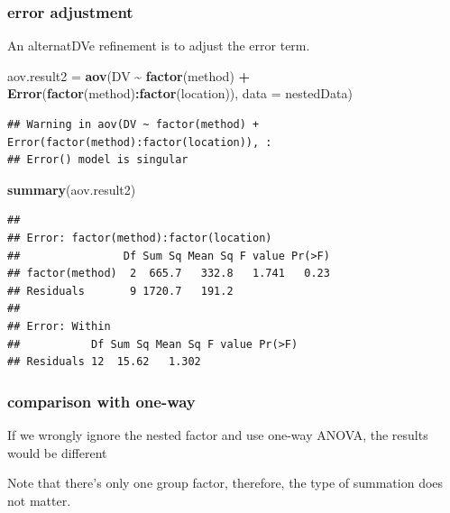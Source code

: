 \documentclass[
]{ctexart}
\newenvironment{Shaded}{\begin{snugshade}}{\end{snugshade}}
\newcommand{\AttributeTok}[1]{\textcolor[rgb]{0.13,0.29,0.53}{#1}}
\newcommand{\FunctionTok}[1]{\textcolor[rgb]{0.13,0.29,0.53}{\textbf{#1}}}
\newcommand{\NormalTok}[1]{#1}
\newcommand{\OtherTok}[1]{\textcolor[rgb]{0.56,0.35,0.01}{#1}}
\newcommand{\SpecialCharTok}[1]{\textcolor[rgb]{0.81,0.36,0.00}{\textbf{#1}}}
\begin{document}
\hypertarget{error-adjustment}{%
\subsubsection{error adjustment}\label{error-adjustment}}

An alternatDVe refinement is to adjust the error term.

\begin{Shaded}
\begin{Highlighting}[]
\NormalTok{aov.result2 }\OtherTok{=} \FunctionTok{aov}\NormalTok{(DV }\SpecialCharTok{\textasciitilde{}} \FunctionTok{factor}\NormalTok{(method) }\SpecialCharTok{+} 
                    \FunctionTok{Error}\NormalTok{(}\FunctionTok{factor}\NormalTok{(method)}\SpecialCharTok{:}\FunctionTok{factor}\NormalTok{(location)),}
                  \AttributeTok{data =}\NormalTok{ nestedData)}
\end{Highlighting}
\end{Shaded}

\begin{verbatim}
## Warning in aov(DV ~ factor(method) + Error(factor(method):factor(location)), :
## Error() model is singular
\end{verbatim}

\begin{Shaded}
\begin{Highlighting}[]
\FunctionTok{summary}\NormalTok{(aov.result2)}
\end{Highlighting}
\end{Shaded}

\begin{verbatim}
## 
## Error: factor(method):factor(location)
##                Df Sum Sq Mean Sq F value Pr(>F)
## factor(method)  2  665.7   332.8   1.741   0.23
## Residuals       9 1720.7   191.2               
## 
## Error: Within
##           Df Sum Sq Mean Sq F value Pr(>F)
## Residuals 12  15.62   1.302
\end{verbatim}

\hypertarget{comparison-with-one-way}{%
\subsubsection{comparison with one-way}\label{comparison-with-one-way}}

If we wrongly ignore the nested factor and use one-way ANOVA, the
results would be different

Note that there's only one group factor, therefore, the type of
summation does not matter.
\end{document}

